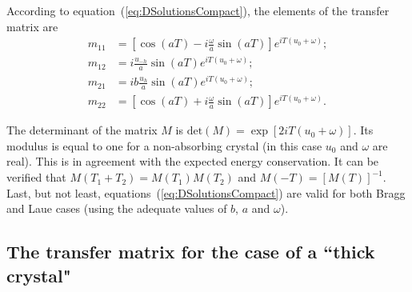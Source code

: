 \documentclass[preprint]{iucr}              %
\begin{document}
According to equation~(\ref{eq:DSolutionsCompact}), the elements of the transfer matrix are
\begin{subequations}\label{eq:MtransferElements}
\begin{align}
m_{11} &= \left[ \cos(aT)-i\frac{\omega}{a}\sin(aT) \right] e^{i T (u_0+\omega)};\\
m_{12} &= i \frac{u_{-h}}{a}\sin(aT) e^{i T (u_0+\omega)};\\
m_{21} &= i b \frac{u_h }{a} \sin(aT) e^{i T (u_0+\omega)};\\
m_{22} &= \left[ \cos(aT)+i \frac{\omega}{a}\sin(aT) \right] e^{i T (u_0+\omega)}.
\end{align}
\end{subequations}

The determinant of the matrix $M$ is $\text{det}(M)=\exp[2 i T (u_0+\omega)]$. Its modulus is equal to one for a non-absorbing crystal (in this case $u_0$ and $\omega$ are real).
This is in agreement with the expected energy conservation. It can be verified that $M(T_1+T_2)=M(T_1) M(T_2)$ and $M(-T)=[M(T)]^{-1}$. Last, but not least, equations~(\ref{eq:DSolutionsCompact}) are valid for both Bragg and Laue cases (using the adequate values of $b$, $a$ and $\omega$).


\subsection{The transfer matrix for the case of a ``thick crystal"}
\label{sec:Mthick}
\end{document}
